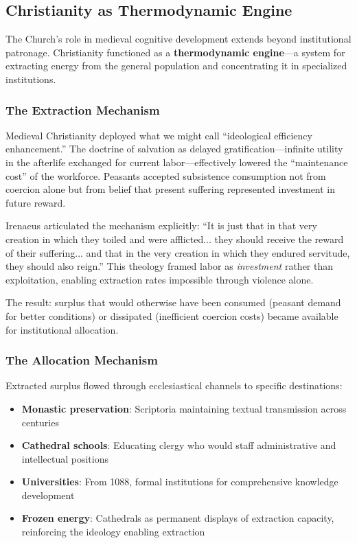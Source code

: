 \subsection{Christianity as Thermodynamic Engine}

The Church's role in medieval cognitive development extends beyond institutional patronage. Christianity functioned as a \textbf{thermodynamic engine}---a system for extracting energy from the general population and concentrating it in specialized institutions.

\subsubsection{The Extraction Mechanism}

Medieval Christianity deployed what we might call ``ideological efficiency enhancement.'' The doctrine of salvation as delayed gratification---infinite utility in the afterlife exchanged for current labor---effectively lowered the ``maintenance cost'' of the workforce. Peasants accepted subsistence consumption not from coercion alone but from belief that present suffering represented investment in future reward.

Irenaeus articulated the mechanism explicitly: ``It is just that in that very creation in which they toiled and were afflicted... they should receive the reward of their suffering... and that in the very creation in which they endured servitude, they should also reign.'' This theology framed labor as \textit{investment} rather than exploitation, enabling extraction rates impossible through violence alone.

The result: surplus that would otherwise have been consumed (peasant demand for better conditions) or dissipated (inefficient coercion costs) became available for institutional allocation.

\subsubsection{The Allocation Mechanism}

Extracted surplus flowed through ecclesiastical channels to specific destinations:
\begin{itemize}
    \item \textbf{Monastic preservation}: Scriptoria maintaining textual transmission across centuries
    \item \textbf{Cathedral schools}: Educating clergy who would staff administrative and intellectual positions
    \item \textbf{Universities}: From 1088, formal institutions for comprehensive knowledge development
    \item \textbf{Frozen energy}: Cathedrals as permanent displays of extraction capacity, reinforcing the ideology enabling extraction
\end{itemize}

